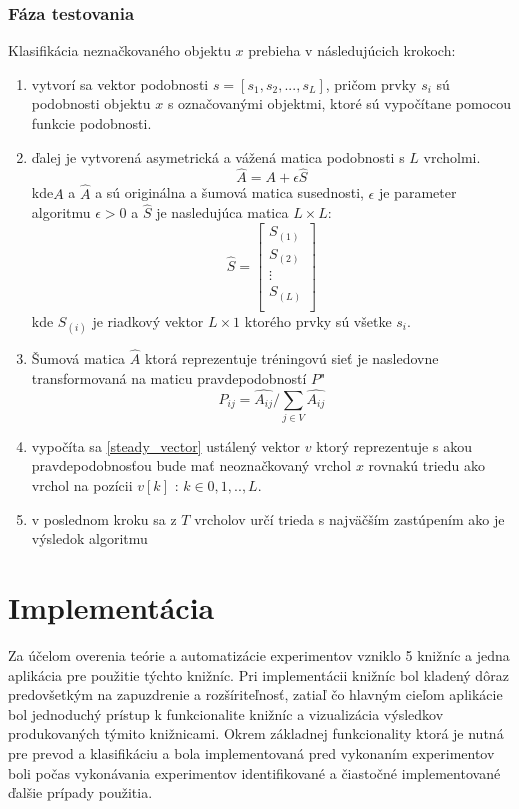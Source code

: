 \documentclass[slovak,master,dept460,male,cpp,cpdeclaration]{diploma}
\begin{document}
\subsubsection{Fáza testovania}
Klasifikácia neznačkovaného objektu $x$ prebieha v následujúcich krokoch:
\begin{enumerate}
\item vytvorí sa vektor podobnosti $s = [s_1, s_2,...,s_L]$, pričom prvky $s_i$ sú podobnosti objektu $x$ s  označovanými objektmi, ktoré sú vypočítane pomocou funkcie podobnosti. 
\item ďalej je vytvorená asymetrická a vážená matica podobnosti s $L$ vrcholmi.
\begin{equation}
\hat{A} = A + \epsilon\hat{S}
\end{equation}
kde$A$ a $\hat{A}$ a  sú originálna a šumová matica susednosti, $\epsilon$ je parameter algoritmu $\epsilon > 0$ a $\hat{S}$ je nasledujúca matica $L \times L$:
\begin{equation}
\hat{S} = 
\begin{bmatrix}
S_{(1)} \\
S_{(2)} \\
\vdots \\
S_{(L)} \\
\end{bmatrix}
\end{equation}
kde $S_{(i)}$ je riadkový vektor $L \times 1$ ktorého prvky sú všetke $s_i$.
\item Šumová matica $\hat{A}$ ktorá reprezentuje tréningovú sieť je nasledovne transformovaná na maticu pravdepodobností $P$"
\begin{equation}
P_{ij} = \hat{A_{ij}} / \sum_{j \in V} \hat{A_{ij}}
\end{equation}
\item vypočíta sa  \ref{steady_vector} ustálený vektor $v$ ktorý reprezentuje s akou pravdepodobnosťou bude mať neoznačkovaný vrchol $x$ rovnakú triedu ako vrchol na pozícii $v[k]$ : $k \in {0,1,..,L}$.
\item v poslednom kroku sa z $T$ vrcholov určí trieda s najväčším zastúpením ako je výsledok algoritmu
\end{enumerate}



\section{Implementácia}
Za účelom overenia teórie a automatizácie experimentov vzniklo 5 knižníc a jedna aplikácia pre použitie týchto knižníc. Pri implementácii knižníc bol kladený dôraz predovšetkým na zapuzdrenie a rozšíriteľnosť, zatiaľ čo hlavným cieľom aplikácie bol jednoduchý prístup k funkcionalite knižníc a vizualizácia výsledkov produkovaných týmito knižnicami. Okrem základnej funkcionality ktorá je nutná pre prevod a klasifikáciu a bola implementovaná pred vykonaním experimentov boli počas vykonávania experimentov identifikované a čiastočné implementované ďalšie prípady použitia.
\end{document}
